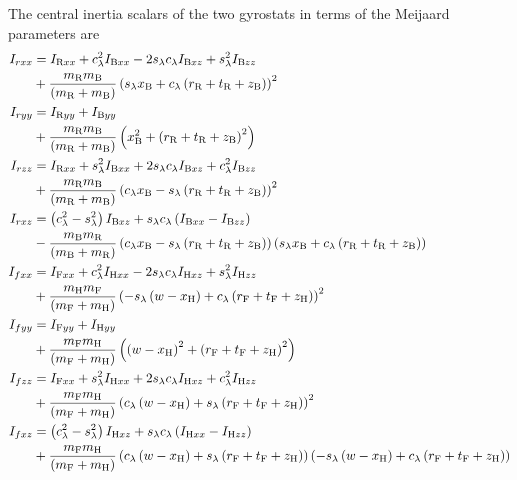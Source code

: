 The central inertia scalars of the two gyrostats in terms of the Meijaard
parameters are
\begin{align}
I_{rxx} &=
I_{\text{R}xx} +
c_\lambda^2 I_{\text{B}xx} - 2 s_\lambda c_\lambda I_{\text{B}xz} + s_\lambda^2
I_{\text{B}zz} \notag\\
& + \frac{m_\text{R} m_\text{B}}{\left(m_\text{R} +
m_\text{B}\right)}\left(s_\lambda x_\text{B} + c_\lambda \left(r_\text{R} +
t_\text{R} + z_\text{B}\right)\right)^2 \\
%
I_{ryy} &= I_{\text{R}yy} + I_{\text{B}yy} \notag\\
& + \frac{m_\text{R} m_\text{B}}{\left(m_\text{R} + m_\text{B}\right)}
\left(x_\text{B}^2 + \left(r_\text{R} + t_\text{R} + z_\text{B}\right)^2
\right) \\
%
I_{rzz} &= I_{\text{R}xx} +
s_\lambda^2 I_{\text{B}xx} + 2 s_\lambda c_\lambda I_{\text{B}xz} + c_\lambda^2
I_{\text{B}zz} \notag\\
& + \frac{m_\text{R} m_\text{B}}{\left(m_\text{R} + m_\text{B}\right)}
\left(c_{\lambda} x_\text{B} - s_\lambda \left(r_\text{R} + t_\text{R} +
z_\text{B}\right)\right)^{2}\\
%
I_{rxz} &= \left(c_\lambda^2 - s_\lambda^2\right) I_{\text{B}xz}
+ s_\lambda c_\lambda \left(I_{\text{B}xx} - I_{\text{B}zz}\right) \notag\\
& - \frac{m_\text{B} m_\text{R}}{\left(m_\text{B} + m_\text{R}\right)}
\left(c_\lambda x_\text{B} - s_\lambda \left(r_\text{R} + t_\text{R} +
z_\text{B}\right)\right) \left(s_{\lambda} x_\text{B} + c_\lambda \left(r_\text{R} + t_\text{R} +
z_\text{B}\right)\right) \\
%
I_{fxx} &= I_{\text{F}xx} +
c_\lambda^2 I_{\text{H}xx} - 2 s_\lambda c_\lambda I_{\text{H}xz} + s_\lambda^2
I_{\text{H}zz} \notag\\
& + \frac{m_\text{H} m_\text{F}}{\left(m_\text{F} + m_\text{H}\right)} \left(- s_{\lambda} \left(w -
x_\text{H}\right) + c_{\lambda}
\left(r_\text{F} + t_\text{F} + z_\text{H}\right)\right)^{2}\\
%
I_{fyy} &= I_{\text{F}yy} + I_{\text{H}yy} \notag \\
& + \frac{m_\text{F} m_\text{H}}{\left(m_\text{F} + m_\text{H}\right)}
\left(\left(w - x_\text{H}\right)^2 + \left(r_\text{F} + t_\text{F} +
z_\text{H}\right)^2\right) \\
%
I_{fzz} &= I_{\text{F}xx} +
s_\lambda^2 I_{\text{H}xx} + 2 s_\lambda c_\lambda I_{\text{H}xz} + c_\lambda^2
I_{\text{H}zz} \notag\\
& + \frac{m_\text{F} m_\text{H}}{\left(m_\text{F} + m_\text{H}\right)} \left(c_{\lambda}
\left(w - x_\text{H}\right) + s_{\lambda} \left(r_\text{F} + t_\text{F} +
z_\text{H}\right)\right)^{2}\\
%
I_{fxz} &= \left(c_\lambda^2 - s_\lambda^2\right) I_{\text{H}xz}
+ s_\lambda c_\lambda \left(I_{\text{H}xx} - I_{\text{H}zz}\right) \notag\\
& + \frac{m_\text{F} m_\text{H}}{\left(m_\text{F} + m_\text{H}\right)}
\left(c_\lambda \left(w - x_\text{H}\right) + s_\lambda \left(r_\text{F} +
t_\text{F} + z_\text{H}\right)\right) \left(- s_{\lambda} \left(w -
x_\text{H}\right) + c_\lambda \left(r_\text{F} + t_\text{F} +
z_\text{H}\right)\right)
\end{align}

